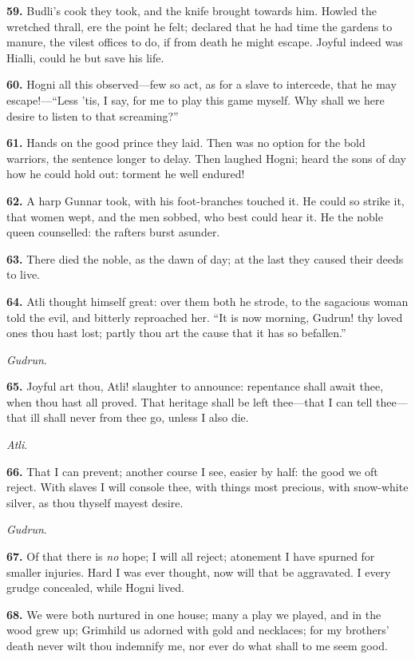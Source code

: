 \textbf{59.} Budli's cook they took, and the knife brought towards him.
Howled the wretched thrall, ere the point he felt; declared that he
had time the gardens to manure, the vilest offices to do, if from
death he might escape. Joyful indeed was Hialli, could he but save his
life.

\textbf{60.} Hogni all this observed—few so act, as for a slave to
intercede, that he may escape!—``Less 'tis, I say, for me to play this
game myself. Why shall we here desire to listen to that screaming?''

\textbf{61.} Hands on the good prince they laid. Then was no option for the
bold warriors, the sentence longer to delay. Then laughed Hogni;
heard the sons of day how he could hold out: torment he well endured!

\textbf{62.} A harp Gunnar took, with his foot-branches touched it. He could
so strike it, that women wept, and the men sobbed, who best could hear
it. He the noble queen counselled: the rafters burst asunder.

\textbf{63.} There died the noble, as the dawn of day; at the last they
caused their deeds to live.

\textbf{64.} Atli thought himself great: over them both he strode, to the
sagacious woman told the evil, and bitterly reproached her. ``It is now
morning, Gudrun! thy loved ones thou hast lost; partly thou art the
cause that it has so befallen.''

\emph{Gudrun}.

\textbf{65.} Joyful art thou, Atli! slaughter to announce: repentance shall
await thee, when thou hast all proved. That heritage shall be left
thee—that I can tell thee—that ill shall never from thee go, unless
I also die.

\emph{Atli}.

\textbf{66.} That I can prevent; another course I see, easier by half: the
good we oft reject. With slaves I will console thee, with things most
precious, with snow-white silver, as thou thyself mayest desire.

\emph{Gudrun}.

\textbf{67.} Of that there is \emph{no} hope; I will all reject; atonement I have
spurned for smaller injuries. Hard I was ever thought, now will that
be aggravated. I every grudge concealed, while Hogni lived.

\textbf{68.} We were both nurtured in one house; many a play we played, and
in the wood grew up; Grimhild us adorned with gold and necklaces; for
my brothers' death never wilt thou indemnify me, nor ever do what
shall to me seem good.

